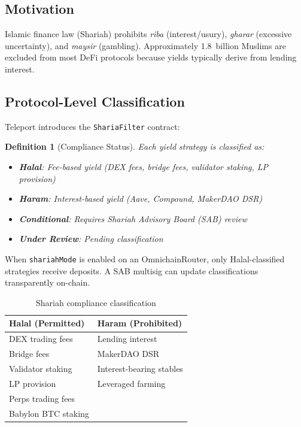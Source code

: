 \documentclass[11pt,twocolumn]{article}
\newtheorem{definition}[theorem]{Definition}
\begin{document}
\subsection{Motivation}

Islamic finance law (Shariah) prohibits \emph{riba} (interest/usury), \emph{gharar} (excessive uncertainty), and \emph{maysir} (gambling). Approximately 1.8~billion Muslims are excluded from most DeFi protocols because yields typically derive from lending interest.

\subsection{Protocol-Level Classification}

Teleport introduces the \texttt{ShariaFilter} contract:

\begin{definition}[Compliance Status]
Each yield strategy is classified as:
\begin{itemize}[nosep]
  \item \textbf{Halal}: Fee-based yield (DEX fees, bridge fees, validator staking, LP provision)
  \item \textbf{Haram}: Interest-based yield (Aave, Compound, MakerDAO DSR)
  \item \textbf{Conditional}: Requires Shariah Advisory Board (SAB) review
  \item \textbf{Under Review}: Pending classification
\end{itemize}
\end{definition}

When \texttt{shariahMode} is enabled on an OmnichainRouter, only Halal-classified strategies receive deposits. A SAB multisig can update classifications transparently on-chain.

\begin{table}[h]
\centering
\small
\begin{tabular}{ll}
\toprule
\textbf{Halal (Permitted)} & \textbf{Haram (Prohibited)} \\
\midrule
DEX trading fees & Lending interest \\
Bridge fees & MakerDAO DSR \\
Validator staking & Interest-bearing stables \\
LP provision & Leveraged farming \\
Perps trading fees & \\
Babylon BTC staking & \\
\bottomrule
\end{tabular}
\caption{Shariah compliance classification}
\label{tab:shariah}
\end{table}
\end{document}
